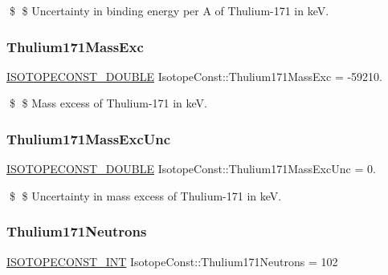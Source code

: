 \$ \$ Uncertainty in binding energy per A of Thulium-\/171 in keV. \mbox{\label{group___isotope_const-_thulium-_tm171_ga38ee05b3339543613bcfb72c8ec47556}} 
\subsubsection{\texorpdfstring{Thulium171\+Mass\+Exc}{Thulium171MassExc}}
{\footnotesize\ttfamily \mbox{\hyperlink{group___isotope_const-_macros_ga8f45a7272ce02c0b4c65c44636ed719a}{I\+S\+O\+T\+O\+P\+E\+C\+O\+N\+S\+T\+\_\+\+D\+O\+U\+B\+LE}} Isotope\+Const\+::\+Thulium171\+Mass\+Exc = -\/59210.}

\$ \$ Mass excess of Thulium-\/171 in keV. \mbox{\label{group___isotope_const-_thulium-_tm171_ga6220ddacddbe13fca6a2df403efcfc23}} 
\subsubsection{\texorpdfstring{Thulium171\+Mass\+Exc\+Unc}{Thulium171MassExcUnc}}
{\footnotesize\ttfamily \mbox{\hyperlink{group___isotope_const-_macros_ga8f45a7272ce02c0b4c65c44636ed719a}{I\+S\+O\+T\+O\+P\+E\+C\+O\+N\+S\+T\+\_\+\+D\+O\+U\+B\+LE}} Isotope\+Const\+::\+Thulium171\+Mass\+Exc\+Unc = 0.}

\$ \$ Uncertainty in mass excess of Thulium-\/171 in keV. \mbox{\label{group___isotope_const-_thulium-_tm171_ga9e2509ab9868e65c9d8d050fbb507598}} 
\subsubsection{\texorpdfstring{Thulium171\+Neutrons}{Thulium171Neutrons}}
{\footnotesize\ttfamily \mbox{\hyperlink{group___isotope_const-_macros_ga5f18360b3e99483a35c32d789e62621c}{I\+S\+O\+T\+O\+P\+E\+C\+O\+N\+S\+T\+\_\+\+I\+NT}} Isotope\+Const\+::\+Thulium171\+Neutrons = 102}


